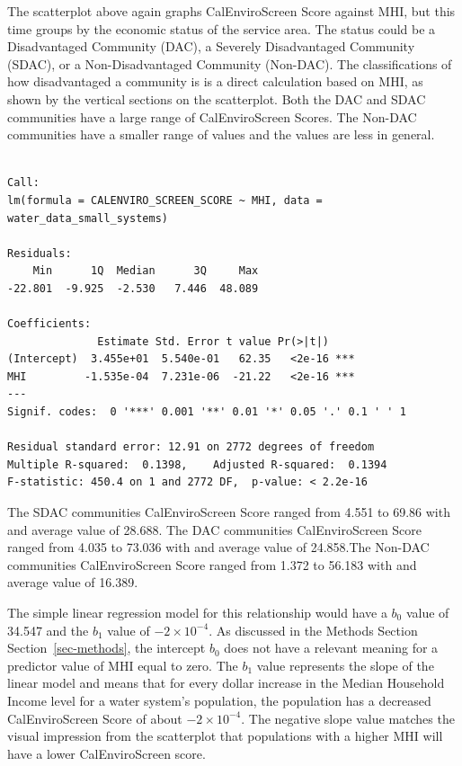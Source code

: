 \documentclass[
  letterpaper,
  DIV=11,
  numbers=noendperiod]{scrartcl}
\begin{document}
The scatterplot above again graphs CalEnviroScreen Score against MHI,
but this time groups by the economic status of the service area. The
status could be a Disadvantaged Community (DAC), a Severely
Disadvantaged Community (SDAC), or a Non-Disadvantaged Community
(Non-DAC). The classifications of how disadvantaged a community is is a
direct calculation based on MHI, as shown by the vertical sections on
the scatterplot. Both the DAC and SDAC communities have a large range of
CalEnviroScreen Scores. The Non-DAC communities have a smaller range of
values and the values are less in general.

\begin{verbatim}

Call:
lm(formula = CALENVIRO_SCREEN_SCORE ~ MHI, data = water_data_small_systems)

Residuals:
    Min      1Q  Median      3Q     Max 
-22.801  -9.925  -2.530   7.446  48.089 

Coefficients:
              Estimate Std. Error t value Pr(>|t|)    
(Intercept)  3.455e+01  5.540e-01   62.35   <2e-16 ***
MHI         -1.535e-04  7.231e-06  -21.22   <2e-16 ***
---
Signif. codes:  0 '***' 0.001 '**' 0.01 '*' 0.05 '.' 0.1 ' ' 1

Residual standard error: 12.91 on 2772 degrees of freedom
Multiple R-squared:  0.1398,    Adjusted R-squared:  0.1394 
F-statistic: 450.4 on 1 and 2772 DF,  p-value: < 2.2e-16
\end{verbatim}

The SDAC communities CalEnviroScreen Score ranged from 4.551 to 69.86
with and average value of 28.688. The DAC communities CalEnviroScreen
Score ranged from 4.035 to 73.036 with and average value of 24.858.The
Non-DAC communities CalEnviroScreen Score ranged from 1.372 to 56.183
with and average value of 16.389.

The simple linear regression model for this relationship would have a
\(b_0\) value of 34.547 and the \(b_1\) value of
\ensuremath{-2\times 10^{-4}}. As discussed in the Methods Section
Section~\ref{sec-methods}, the intercept \(b_0\) does not have a
relevant meaning for a predictor value of MHI equal to zero. The \(b_1\)
value represents the slope of the linear model and means that for every
dollar increase in the Median Household Income level for a water
system's population, the population has a decreased CalEnviroScreen
Score of about \ensuremath{-2\times 10^{-4}}. The negative slope value
matches the visual impression from the scatterplot that populations with
a higher MHI will have a lower CalEnviroScreen score.
\end{document}
